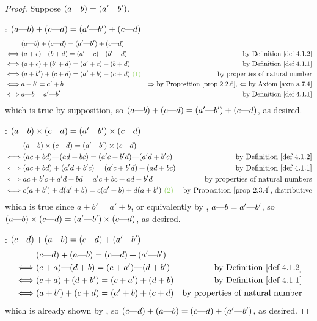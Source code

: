 \begin{proof}
Suppose \((a \text{---} b) = (a' \text{---} b')\).

: \((a \text{---} b) + (c \text{---} d) = (a' \text{---} b') + (c \text{---} d)\)
\begin{align*}
         & (a \M b) + (c \M d) = (a' \M b') + (c \M d) \\
    \iff & (a + c) \M (b + d) = (a' + c) \M (b' + d) & \text{by \DEF{4.1.2}} \\
    \iff & (a + c) + (b' + d) = (a' + c) + (b + d) & \text{by \DEF{4.1.1}} \\
    \iff & (a + b') + (c + d) = (a' + b) + (c + d) \GREEN{\ (1)} & \text{by properties of natural number} \\
    \iff & a + b' = a' + b & \text{\(\Rightarrow\) by \PROP{2.2.6}, \(\Leftarrow\) by \AXM{a.7.4}} \\
    \iff & a \M b = a' \M b' & \text{by \DEF{4.1.1}}
\end{align*}
which is true by supposition, so \((a \text{---} b) + (c \text{---} d) = (a' \text{---} b') + (c \text{---} d)\), as desired.
    
: \((a \text{---} b) \times (c \text{---} d) = (a' \text{---} b') \times (c \text{---} d)\)
\begin{align*}
         & (a \M b) \X (c \M d) = (a' \M b') \X (c \M d) \\
    \iff & (ac + bd) \M (ad + bc) = (a'c + b'd) \M (a'd + b'c) & \text{by \DEF{4.1.2}} \\
    \iff & (ac + bd) + (a'd + b'c) = (a'c + b'd) + (ad + bc) & \text{by \DEF{4.1.1}} \\
    \iff & ac + b'c + a'd + bd = a'c + bc + ad + b'd & \text{by properties of natural numbers} \\
    \iff & c(a + b') + d(a' + b) = c(a' + b) + d(a + b') \GREEN{\ (2)} & \text{by \PROP{2.3.4}, distributive}
\end{align*}
which is true since \(a + b' = a' + b\), or equivalently by , \(a \text{---} b = a' \text{---} b'\), so \((a \text{---} b) \times (c \text{---} d) = (a' \text{---} b') \times (c \text{---} d)\), as desired.

: \((c \text{---} d) + (a \text{---} b) = (c \text{---} d) + (a' \text{---} b')\)
\begin{align*}
         & (c \M d) + (a \M b) = (c \M d) + (a' \M b') \\
    \iff & (c + a) \M (d + b) = (c + a') \M (d + b') & \text{by \DEF{4.1.2}} \\
    \iff & (c + a) + (d + b') = (c + a') + (d + b) & \text{by \DEF{4.1.1}} \\
    \iff & (a + b') + (c + d) = (a' + b) + (c + d) & \text{by properties of natural number}
\end{align*}
which is already shown by , so \((c \text{---} d) + (a \text{---} b) = (c \text{---} d) + (a' \text{---} b')\), as desired.


\end{proof}
